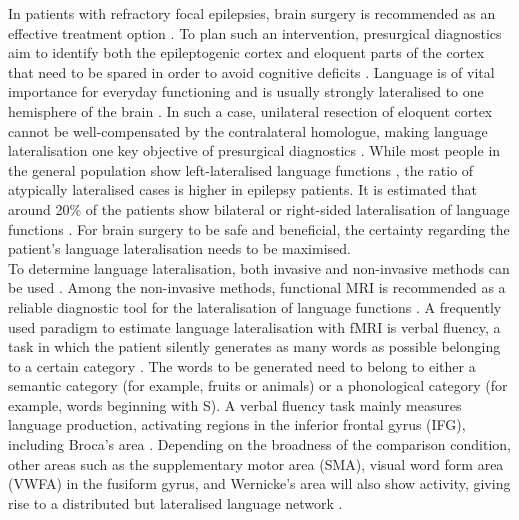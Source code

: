 \documentclass[fleqn,10pt]{SelfArx} %
\begin{document}
In patients with refractory focal epilepsies, brain surgery is recommended as an effective treatment option \citep{Kwan_2009}. To plan such an intervention, presurgical diagnostics aim to identify both the epileptogenic cortex and eloquent parts of the cortex that need to be spared in order to avoid cognitive deficits \citep{Rosenow_2001, Labudda_2010}. Language is of vital importance for everyday functioning and is usually strongly lateralised to one hemisphere of the brain \citep{Knecht_2000}. In such a case, unilateral resection of eloquent cortex cannot be well-compensated by the contralateral homologue, making language lateralisation one key objective of presurgical diagnostics \citep{Binder_1996, Sabsevitz_2003}. While most people in the general population show left-lateralised language functions \citep{Springer_1999}, the ratio of atypically lateralised cases is higher in epilepsy patients. It is estimated that around 20\% of the patients show bilateral or right-sided lateralisation of language functions \citep{Springer_1999}. For brain surgery to be safe and beneficial, the certainty regarding the patient’s language lateralisation needs to be maximised.\\
To determine language lateralisation, both invasive and non-invasive methods can be used \citep{Binder_1996, Rutten_2002, Woermann_2003}. Among the non-invasive methods, functional MRI is recommended as a reliable diagnostic tool for the lateralisation of language functions \citep{Binder_2011, Szaflarski_2017}. A frequently used paradigm to estimate language lateralisation with fMRI is verbal fluency, a task in which the patient silently generates as many words as possible belonging to a certain category \citep{Henry_2004}. The words to be generated need to belong to either a semantic category (for example, fruits or animals) or a phonological category (for example, words beginning with S). A verbal fluency task mainly measures language production, activating regions in the inferior frontal gyrus (IFG), including Broca’s area \citep{Gaillard_2000, Arora_2009}. Depending on the broadness of the comparison condition, other areas such as the supplementary motor area (SMA), visual word form area (VWFA) in the fusiform gyrus, and Wernicke’s area will also show activity, giving rise to a distributed but lateralised language network \citep{Lurito_2000, Price_2010}.\\
\end{document}
